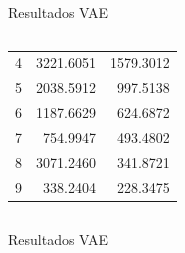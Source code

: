 \documentclass{beamer}
\begin{document}
\begin{frame}{Resultados VAE}
\begin{columns}
\begin{table}
{\begin{tabular}{rrr}
            4 &    3221.6051 &   1579.3012 \\
            5 &    2038.5912 &    997.5138 \\
            6 &    1187.6629 &    624.6872 \\
            7 &     754.9947 &    493.4802 \\
            8 &    3071.2460 &    341.8721 \\
            9 &     338.2404 &    228.3475 \\
        \end{tabular}
      }
    \end{table}
  \end{columns}
\end{frame}

\begin{frame}{Resultados VAE}
  
  \begin{columns}
    \vspace{1cm}
    \column{7.5cm}
    

\end{columns}
\end{frame}
\end{document}
